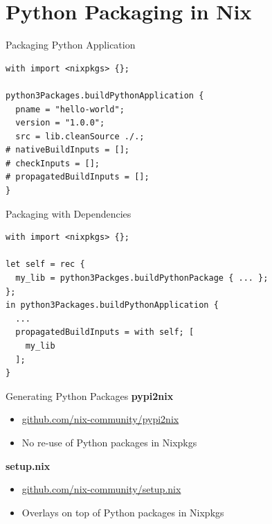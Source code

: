 \documentclass[12pt,aspectratio=169]{beamer}
\begin{document}

\section{Python Packaging in Nix}


\begin{frame}[fragile]{Packaging Python Application}
  \begin{verbatim}
with import <nixpkgs> {};

python3Packages.buildPythonApplication {
  pname = "hello-world";
  version = "1.0.0";
  src = lib.cleanSource ./.;
# nativeBuildInputs = [];
# checkInputs = [];
# propagatedBuildInputs = [];
}
  \end{verbatim}
\end{frame}


\begin{frame}[fragile]{Packaging with Dependencies}
  \begin{verbatim}
with import <nixpkgs> {};

let self = rec {
  my_lib = python3Packges.buildPythonPackage { ... };
};
in python3Packages.buildPythonApplication {
  ...
  propagatedBuildInputs = with self; [
    my_lib
  ];
}
  \end{verbatim}
\end{frame}


\begin{frame}[fragile]{Generating Python Packages}
  \textbf{pypi2nix}
  \begin{itemize}
    \item \href{https://github.com/nix-community/pypi2nix}{github.com/nix-community/pypi2nix}
    \item No re-use of Python packages in Nixpkgs
  \end{itemize}
  \textbf{setup.nix}
  \begin{itemize}
    \item \href{https://github.com/nix-community/setup.nix}{github.com/nix-community/setup.nix}
    \item Overlays on top of Python packages in Nixpkgs
  \end{itemize}
\end{frame}
\end{document}
